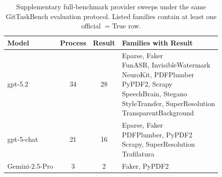 \begin{table}[t]
\caption{Supplementary full-benchmark provider sweeps under the same GitTaskBench evaluation protocol. Listed families contain at least one official \resultmetric$=$True row.}
\label{tab:provider-full54-summary}
\centering
\scriptsize
\setlength{\tabcolsep}{3.5pt}
\begin{tabular}{@{}p{}ccp{}@{}}
\toprule
\rowcolor{cyan!12}
Model & Process & Result & Families with Result \\
\midrule
\rowcolors{2}{cyan!4}{white}
gpt-5.2 & 34 & 28 & \shortstack[l]{Eparse, Faker\\ FunASR, InvisibleWatermark\\ NeuroKit, PDFPlumber\\ PyPDF2, Scrapy\\ SpeechBrain, Stegano\\ StyleTransfer, SuperResolution\\ TransparentBackground} \\
gpt-5-chat & 21 & 16 & \shortstack[l]{Eparse, Faker\\ PDFPlumber, PyPDF2\\ Scrapy, SuperResolution\\ Trafilatura} \\
Gemini-2.5-Pro & 3 & 2 & Faker, PyPDF2 \\
\bottomrule
\end{tabular}
\setlength{\tabcolsep}{6pt}
\end{table}
